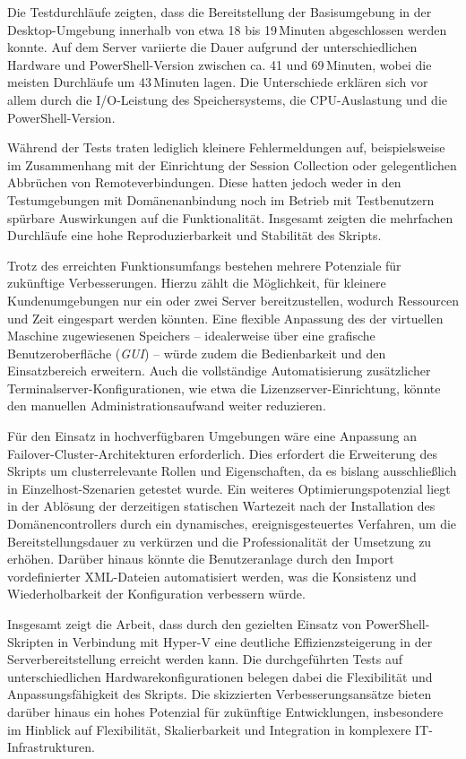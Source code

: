 \documentclass[conference]{IEEEtran}
\begin{document}
Die Testdurchläufe zeigten, dass die Bereitstellung der Basisumgebung in der Desktop-Umgebung innerhalb von etwa 18 bis 19 Minuten abgeschlossen werden konnte. Auf dem Server variierte die Dauer aufgrund der unterschiedlichen Hardware und PowerShell-Version zwischen ca. 41 und 69 Minuten, wobei die meisten Durchläufe um 43 Minuten lagen. Die Unterschiede erklären sich vor allem durch die I/O-Leistung des Speichersystems, die CPU-Auslastung und die PowerShell-Version.

Während der Tests traten lediglich kleinere Fehlermeldungen auf, beispielsweise im Zusammenhang mit der Einrichtung der Session Collection oder gelegentlichen Abbrüchen von Remoteverbindungen. Diese hatten jedoch weder in den Testumgebungen mit Domänenanbindung noch im Betrieb mit Testbenutzern spürbare Auswirkungen auf die Funktionalität. Insgesamt zeigten die mehrfachen Durchläufe eine hohe Reproduzierbarkeit und Stabilität des Skripts.

Trotz des erreichten Funktionsumfangs bestehen mehrere Potenziale für zukünftige Verbesserungen. Hierzu zählt die Möglichkeit, für kleinere Kundenumgebungen nur ein oder zwei Server bereitzustellen, wodurch Ressourcen und Zeit eingespart werden könnten. Eine flexible Anpassung des der virtuellen Maschine zugewiesenen Speichers – idealerweise über eine grafische Benutzeroberfläche (\textit{GUI}) – würde zudem die Bedienbarkeit und den Einsatzbereich erweitern. Auch die vollständige Automatisierung zusätzlicher Terminalserver-Konfigurationen, wie etwa die Lizenzserver-Einrichtung, könnte den manuellen Administrationsaufwand weiter reduzieren.

Für den Einsatz in hochverfügbaren Umgebungen wäre eine Anpassung an Failover-Cluster-Architekturen erforderlich. Dies erfordert die Erweiterung des Skripts um clusterrelevante Rollen und Eigenschaften, da es bislang ausschließlich in Einzelhost-Szenarien getestet wurde. Ein weiteres Optimierungspotenzial liegt in der Ablösung der derzeitigen statischen Wartezeit nach der Installation des Domänencontrollers durch ein dynamisches, ereignisgesteuertes Verfahren, um die Bereitstellungsdauer zu verkürzen und die Professionalität der Umsetzung zu erhöhen. Darüber hinaus könnte die Benutzeranlage durch den Import vordefinierter XML-Dateien automatisiert werden, was die Konsistenz und Wiederholbarkeit der Konfiguration verbessern würde.

Insgesamt zeigt die Arbeit, dass durch den gezielten Einsatz von PowerShell-Skripten in Verbindung mit Hyper-V eine deutliche Effizienzsteigerung in der Serverbereitstellung erreicht werden kann. Die durchgeführten Tests auf unterschiedlichen Hardwarekonfigurationen belegen dabei die Flexibilität und Anpassungsfähigkeit des Skripts. Die skizzierten Verbesserungsansätze bieten darüber hinaus ein hohes Potenzial für zukünftige Entwicklungen, insbesondere im Hinblick auf Flexibilität, Skalierbarkeit und Integration in komplexere IT-Infrastrukturen.
\newpage
\end{document}
